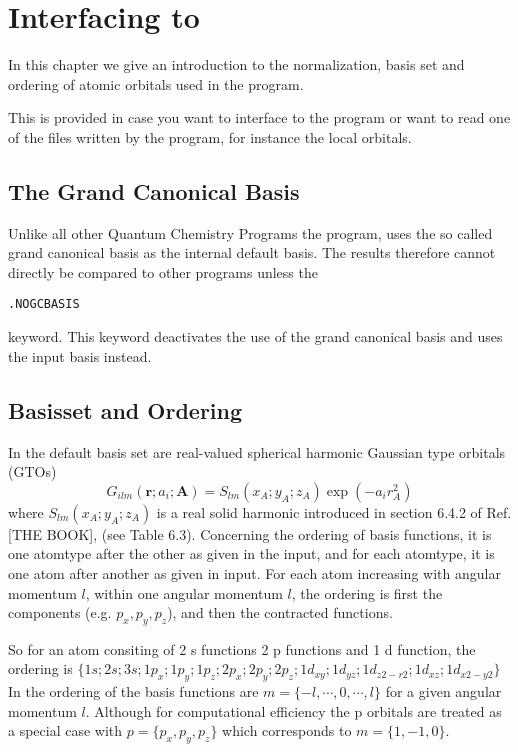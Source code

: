 \chapter{Interfacing to {\lsdalton}}\label{interfacing}

In this chapter we give an introduction to the normalization, basis set and ordering of atomic orbitals used in the {\lsdalton} program. 

This is provided in case you want to interface to the {\lsdalton} program or want to read one of the files written by the {\lsdalton} program, for instance 
the local orbitals.
\section{The Grand Canonical Basis}

Unlike all other Quantum Chemistry Programs the {\lsdalton} program, uses the so called grand canonical basis as the internal default basis. The results therefore cannot directly be compared to other programs unless the 
\begin{verbatim}
.NOGCBASIS
\end{verbatim}
keyword. This keyword deactivates the use of the grand canonical basis and uses the input basis instead. 

\section{Basisset and Ordering}

In {\lsdalton} the default basis set are real-valued spherical harmonic Gaussian type
orbitals (GTOs)
\begin{equation}
G_{ilm}(\textbf{r}; a_{i};\textbf{A}) = S_{lm}(x_{A}; y_{A}; z_{A}) \exp(-a_{i}r^{2}_{A})
\end{equation}
where $S_{lm}(x_{A}; y_{A}; z_{A})$ is a real solid harmonic introduced in section 6.4.2 of Ref. [THE BOOK], (see Table 6.3).
Concerning the ordering of basis functions, it is one atomtype after the other as given
in the input, and for each atomtype, it is one atom after another as given in input. For
each atom increasing with angular momentum $l$, within one angular momentum $l$, the ordering 
is first the components (e.g. $p_{x},p_{y},p_{z}$), and then the contracted functions.



So for an atom consiting of 2 s functions 2 p functions and 1 d function, the ordering is
$\{1s; 2s; 3s; 1p_{x};1p_{y};1p_{z}; 2p_{x};2p_{y};2p_{z}; 1d_{xy}; 1d_{yz}; 1d_{z2-r2} ; 1d_{xz}; 1d_{x2-y2}\}$
In {\lsdalton} the ordering of the basis functions are $m = \{-l,\cdots,0,\cdots,l\}$ for a given
angular momentum $l$. Although for computational efficiency the p orbitals are treated as a
special case with $p = \{ p_{x},p_{y},p_{z} \}$ which corresponds to $m = \{1,-1,0 \}$.


